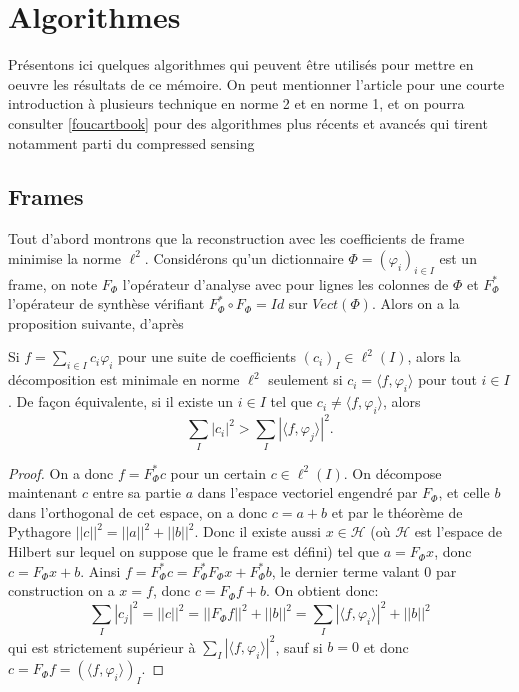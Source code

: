 \section{Algorithmes}
Présentons ici quelques algorithmes qui peuvent être utilisés pour mettre en oeuvre les résultats de ce mémoire. On peut mentionner l'article \cite{ChenDonoho} pour une courte introduction à plusieurs technique en norme 2 et en norme 1, et on pourra consulter \ref{foucartbook} pour des algorithmes plus récents et avancés qui tirent notamment parti du compressed sensing
\subsection{Frames}\label{recframe}
Tout d'abord montrons que la reconstruction avec les coefficients de frame minimise la norme $\ell^2$.
Considérons qu'un dictionnaire $\Phi=(\varphi_i)_{i\in I}$ est un frame, on note $F_\Phi$ l'opérateur d'analyse avec pour lignes les colonnes de $\Phi$ et $F_\Phi^*$ l'opérateur de synthèse vérifiant $F_\Phi^* \circ F_\Phi =Id$ sur $Vect(\Phi)$.
Alors on a la proposition suivante, d'après \cite{daubbook}
\begin{proposition}\label{bestframe}
	Si $f =\sum_{i \in I} c_i \varphi_i$ pour une suite de coefficients $(c_i)_I \in \ell^2(I)$,
	alors la décomposition est minimale en norme $\ell^2$ seulement si $c_i = \langle f, \varphi_i \rangle$ pour tout $i\in I$.
	\newline
	De façon équivalente, si il existe un $i \in I$ tel que $c_i \neq \langle f, \varphi_i \rangle$, alors
	\begin{equation}
		\sum_I |c_i|^2 > \sum_I |\langle f, \varphi_j \rangle |^2.
	\end{equation}
\end{proposition}
\begin{proof}
	On a donc $f=F_\Phi^* c$ pour un certain $c\in\ell^2(I)$.
	On décompose maintenant $c$ entre sa partie $a$ dans l'espace vectoriel engendré par $F_\Phi$, et celle $b$ dans l'orthogonal de cet espace, on a donc $c=a+b$ et par le théorème de Pythagore $||c||^2 = ||a||^2 + ||b||^2$.
	Donc il existe aussi $x\in \mathcal{H}$ (où $\mathcal{H}$ est l'espace de Hilbert sur lequel on suppose que le frame est défini) tel que $a=F_\Phi x$, donc $c = F_\Phi x + b$.
	Ainsi $f = F_\Phi ^* c = F_\Phi^* F_\Phi x + F_\Phi^* b$, le dernier terme valant 0 par construction on a $x=f$, donc $c = F_\Phi f + b$. On obtient donc:
	\begin{equation}
		\sum_I |c_j|^2 = ||c||^2 = ||F_\Phi f||^2 + ||b||^2 = \sum_I |\langle f, \varphi_i \rangle|^2 + ||b||^2
	\end{equation}
	qui est strictement supérieur à $\sum_I |\langle f, \varphi_i \rangle |^2$, sauf si $b=0$ et donc $c=F_\Phi f =(\langle f, \varphi_i \rangle)_I$.
\end{proof}
